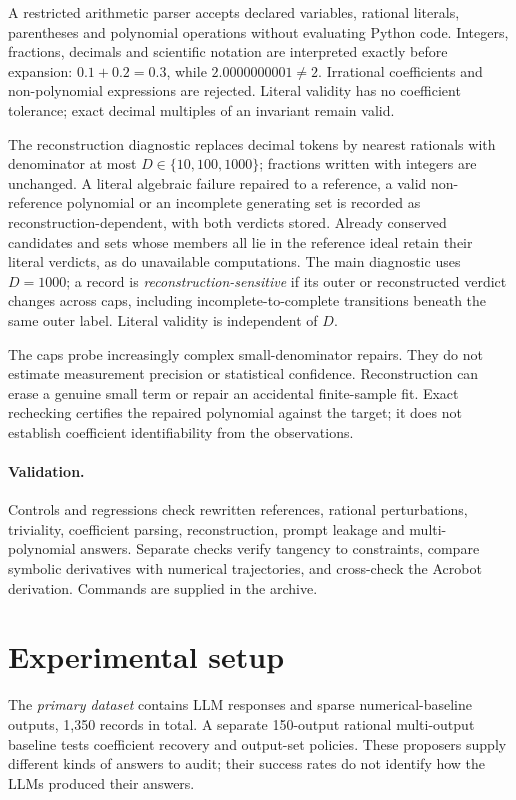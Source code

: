 \documentclass[10pt]{article}
\begin{document}
A restricted arithmetic parser accepts declared variables, rational literals, parentheses and polynomial operations without evaluating Python code. Integers, fractions, decimals and scientific notation are interpreted exactly before expansion: $0.1+0.2=0.3$, while $2.0000000001\ne2$. Irrational coefficients and non-polynomial expressions are rejected. Literal validity has no coefficient tolerance; exact decimal multiples of an invariant remain valid.

The reconstruction diagnostic replaces decimal tokens by nearest rationals with denominator at most $D\in\{10,100,1000\}$; fractions written with integers are unchanged. A literal algebraic failure repaired to a reference, a valid non-reference polynomial or an incomplete generating set is recorded as reconstruction-dependent, with both verdicts stored. Already conserved candidates and sets whose members all lie in the reference ideal retain their literal verdicts, as do unavailable computations. The main diagnostic uses $D=1000$; a record is \emph{reconstruction-sensitive} if its outer or reconstructed verdict changes across caps, including incomplete-to-complete transitions beneath the same outer label. Literal validity is independent of $D$.

The caps probe increasingly complex small-denominator repairs. They do not estimate measurement precision or statistical confidence. Reconstruction can erase a genuine small term or repair an accidental finite-sample fit. Exact rechecking certifies the repaired polynomial against the target; it does not establish coefficient identifiability from the observations.

\paragraph{Validation.} Controls and regressions check rewritten references, rational perturbations, triviality, coefficient parsing, reconstruction, prompt leakage and multi-polynomial answers. Separate checks verify tangency to constraints, compare symbolic derivatives with numerical trajectories, and cross-check the Acrobot derivation. Commands are supplied in the archive.

\section{Experimental setup}\label{sec:protocol}

The \emph{primary dataset} contains \nLLM{} LLM responses and \nBaseline{} sparse numerical-baseline outputs, 1,350 records in total. A separate 150-output rational multi-output baseline tests coefficient recovery and output-set policies. These proposers supply different kinds of answers to audit; their success rates do not identify how the LLMs produced their answers.
\end{document}
